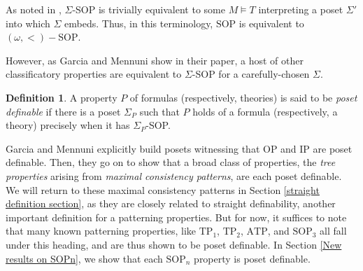 \documentclass{article}
\newcommand{\TP}{\text{TP}}
\newcommand{\SOP}{\text{SOP}}
\theoremstyle{definition}
\newtheorem{definition}{Definition}
\theoremstyle{definition}
\theoremstyle{definition}
\begin{document}


As noted in \cite{garcia2022model}, $\Sigma$-SOP is trivially equivalent to some $M\models T$ interpreting a poset $\Sigma'$ into which $\Sigma$ embeds. Thus, in this terminology, $\SOP$ is equivalent to $(\omega, <)-\SOP$.




However, as Garcia and Mennuni show in their paper, a host of other classificatory properties are equivalent to $\Sigma$-SOP for a carefully-chosen $\Sigma$. 

\begin{definition}\label{poset definable defn}
 A property $P$ of formulas (respectively, theories) is said to be \textit{poset definable} if there is a poset $\Sigma_P$ such that $P$ holds of a formula (respectively, a theory) precisely when it has $\Sigma_P$-SOP. 
\end{definition}

Garcia and Mennuni explicitly build posets witnessing that OP and IP are poset definable. Then, they go on to show that a broad class of properties, the \textit{tree properties} arising from \textit{maximal consistency patterns}, are each poset definable. We will return to these maximal consistency patterns in Section \ref{straight definition section}, as they are closely related to straight definability, another important definition for a patterning properties. But for now, it suffices to note that many known patterning properties, like $\TP_1$, $\TP_2$, $\text{ATP}$, and $\SOP_3$ all fall under this heading, and are thus shown to be poset definable. In Section \ref{New results on SOPn}, we show that each $\mathrm{SOP}_n$  property is poset definable.
\end{document}
